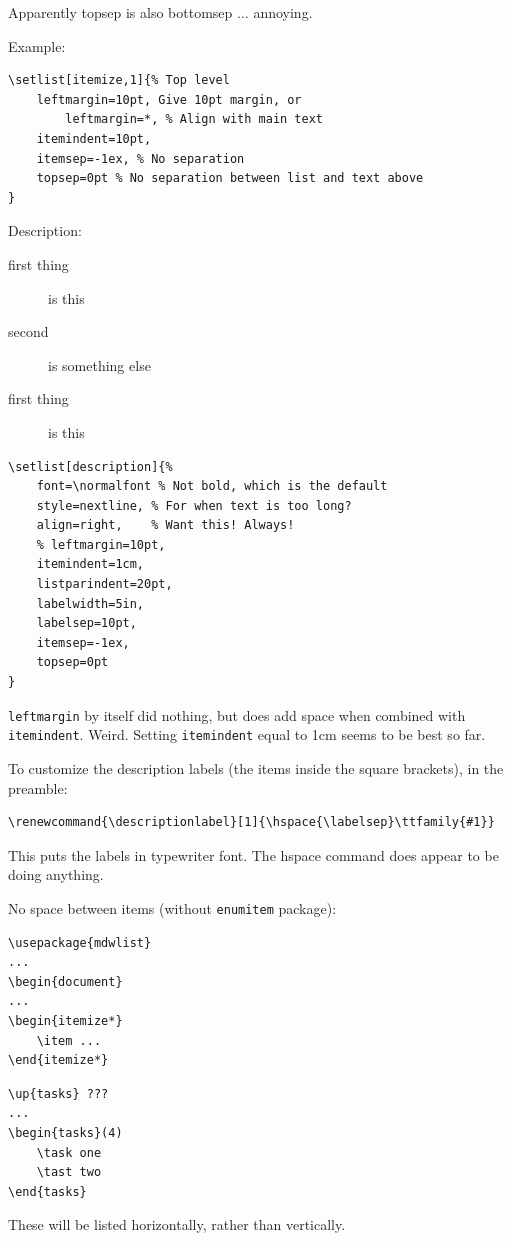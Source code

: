 \documentclass{article}
\renewcommand{\descriptionlabel}[1]{%
    \hspace{\labelsep} %
    \ttfamily{#1}}
\begin{document}
Apparently topsep is also bottomsep $\ldots$ annoying.

Example:
\begin{verbatim}
\setlist[itemize,1]{% Top level
    leftmargin=10pt, Give 10pt margin, or
        leftmargin=*, % Align with main text
    itemindent=10pt,
    itemsep=-1ex, % No separation
    topsep=0pt % No separation between list and text above
}
\end{verbatim}

Description:

\begin{description}%
    \item [first thing] is this
    \item [second] is something else
    \item [first thing] is this
\end{description}

\begin{verbatim}
\setlist[description]{%
    font=\normalfont % Not bold, which is the default
    style=nextline, % For when text is too long?
    align=right,    % Want this! Always!
    % leftmargin=10pt,
    itemindent=1cm,
    listparindent=20pt,
    labelwidth=5in,
    labelsep=10pt,
    itemsep=-1ex,
    topsep=0pt
}
\end{verbatim}

\verb|leftmargin| by itself did nothing, but does add space when combined
with \verb|itemindent|. Weird.
Setting \verb|itemindent| equal to 1cm seems to be best so far.



To customize the description labels (the items inside the square
brackets), in the preamble:
\begin{verbatim}
\renewcommand{\descriptionlabel}[1]{\hspace{\labelsep}\ttfamily{#1}}
\end{verbatim}
This puts the labels in typewriter font. The hspace command does appear
to be doing anything.

No space between items (without \verb|enumitem| package):
\begin{verbatim}
\usepackage{mdwlist}
...
\begin{document}
...
\begin{itemize*}
    \item ...
\end{itemize*}
\end{verbatim}

\begin{verbatim}
\up{tasks} ???
...
\begin{tasks}(4)
    \task one
    \tast two
\end{tasks}
\end{verbatim}
These will be listed horizontally, rather than vertically.
\end{document}
